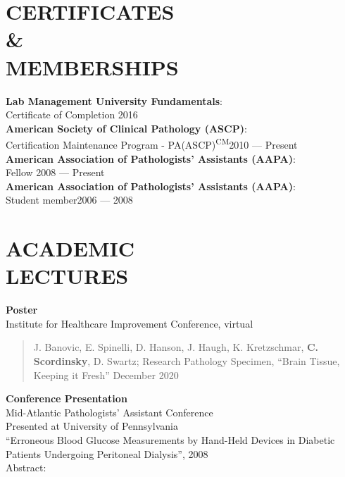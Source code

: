 \documentclass[margin]{res}
\begin{document}
\begin{resume}
\begin{itemize}
\end{itemize}


\section{CERTIFICATES\\ \&\\MEMBERSHIPS}

\textbf{Lab Management University Fundamentals}: \\Certificate 
of Completion \hfill 2016\\
\textbf{American Society of Clinical Pathology (ASCP)}: \\Certification Maintenance Program - PA(ASCP)\textsuperscript{CM}\hfill 2010 --- Present
\\
\textbf{American Association of Pathologists’ Assistants (AAPA)}: \\Fellow \hfill 2008 --- Present
\\
\textbf{American Association of Pathologists’ Assistants 
(AAPA)}: \\Student member\hfill 2006 --- 2008





\section{ACADEMIC\\LECTURES} \textbf{Poster}\\
Institute for Healthcare Improvement Conference, virtual
\begin{quote}
    J. Banovic, E. Spinelli, D. Hanson, J. Haugh, K. Kretzschmar, \textbf{C. Scordinsky}, D. Swartz; Research Pathology Specimen, “Brain Tissue, Keeping it Fresh” December 2020
\end{quote}
\textbf{Conference Presentation}\\
Mid-Atlantic Pathologists’ Assistant Conference\\
Presented at University of Pennsylvania \\
“Erroneous Blood Glucose Measurements by Hand-Held Devices in Diabetic Patients Undergoing Peritoneal Dialysis”, 2008\\
Abstract:
\begin{quote}
    

\end{quote}
\end{resume}
\end{document}
